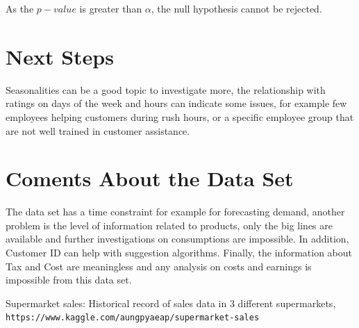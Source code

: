 \documentclass[11pt, a4]{article}
\begin{document}
As the $p-value$ is greater than $\alpha$, the null hypothesis cannot be rejected.

\section*{Next Steps}

Seasonalities can be a good topic to investigate more, the relationship with ratings on days of the week and hours can indicate some issues, for example few employees helping customers during rush hours, or a specific employee group that are not well trained in customer assistance. 

\section*{Coments About the Data Set}

The data set has a time constraint for example for forecasting demand, another problem is the level of information related to products, only the big lines are available and further investigations on consumptions are impossible. In addition, Customer ID can help with suggestion algorithms. Finally, the information about Tax and Cost are meaningless and any analysis on costs and earnings is impossible from this data set. 

\FloatBarrier

\begin{thebibliography}{9}

Supermarket sales:
Historical record of sales data in 3 different supermarkets,
\\\texttt{https://www.kaggle.com/aungpyaeap/supermarket-sales}
\end{thebibliography}
\end{document}
